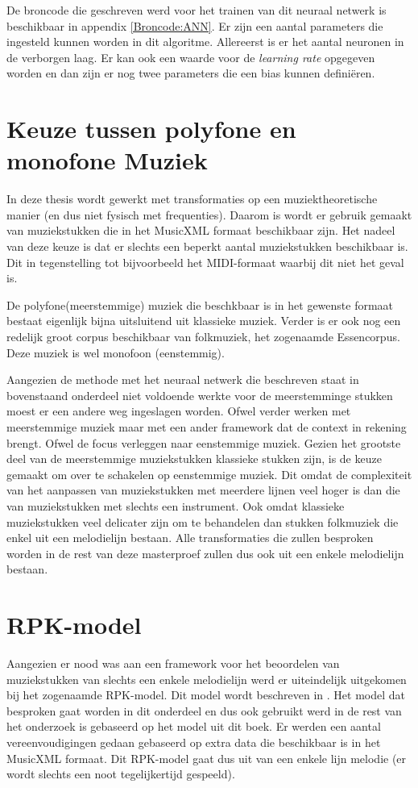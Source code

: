 De broncode die geschreven werd voor het trainen van dit neuraal netwerk is beschikbaar in appendix \ref{Broncode:ANN}. Er zijn een aantal parameters die ingesteld kunnen worden in dit algoritme. Allereerst is er het aantal neuronen in de verborgen laag. Er kan ook een waarde voor de \textit{learning rate} opgegeven worden en dan zijn er nog twee parameters die een bias kunnen defini\"eren.

\section{Keuze tussen polyfone en monofone Muziek}
\label{OBM:OMM}
In deze thesis wordt gewerkt met transformaties op een muziektheoretische manier (en dus niet fysisch met frequenties). Daarom is wordt er gebruik gemaakt van muziekstukken die in het MusicXML\cite{url:musicxml} formaat beschikbaar zijn. Het nadeel van deze keuze is dat er slechts een beperkt aantal muziekstukken beschikbaar is. Dit in tegenstelling tot bijvoorbeeld het MIDI-formaat\cite{url:midi} waarbij dit niet het geval is. 

De polyfone(meerstemmige) muziek die beschkbaar is in het gewenste formaat bestaat eigenlijk bijna uitsluitend uit klassieke muziek. Verder is er ook nog een redelijk groot corpus beschikbaar van folkmuziek, het zogenaamde Essencorpus\cite{url:essen}. Deze muziek is wel monofoon (eenstemmig).

Aangezien de methode met het neuraal netwerk die beschreven staat in bovenstaand onderdeel niet voldoende werkte voor de meerstemminge stukken moest er een andere weg ingeslagen worden. Ofwel verder werken met meerstemmige muziek maar met een ander framework dat de context in rekening brengt. Ofwel de focus verleggen naar eenstemmige muziek. Gezien het grootste deel van de meerstemmige muziekstukken klassieke stukken zijn, is de keuze gemaakt om over te schakelen op eenstemmige muziek. Dit omdat de complexiteit van het aanpassen van muziekstukken met meerdere lijnen veel hoger is dan die van muziekstukken met slechts een instrument. Ook omdat klassieke muziekstukken veel delicater zijn om te behandelen dan stukken folkmuziek die enkel uit een melodielijn bestaan. Alle transformaties die zullen besproken worden in de rest van deze masterproef zullen dus ook uit een enkele melodielijn bestaan.

\section{RPK-model}
\label{OBM:RPK}
Aangezien er nood was aan een framework voor het beoordelen van muziekstukken van slechts een enkele melodielijn werd er uiteindelijk uitgekomen bij het zogenaamde RPK-model. Dit model wordt beschreven in \cite{book:musicAndProbability}. Het model dat besproken gaat worden in dit onderdeel en dus ook gebruikt werd in de rest van het onderzoek is gebaseerd op het model uit dit boek. Er werden een aantal vereenvoudigingen gedaan gebaseerd op extra data die beschikbaar is in het MusicXML formaat. Dit RPK-model gaat dus uit van een enkele lijn melodie (er wordt slechts een noot tegelijkertijd gespeeld). 

